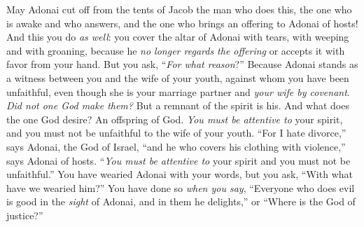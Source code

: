 \begin{biblechapter}
\verse May Adonai cut off from the tents of Jacob the man who does this, the one who is awake and who answers, and the one who brings an offering to Adonai of hosts!
\verse And this you do \textit{as well}: you cover the altar of Adonai with tears, with weeping and with groaning, because he \textit{no longer regards the offering} or accepts it with favor from your hand.
\verse But you ask, “\textit{For what reason}?” Because Adonai stands as a witness between you and the wife of your youth, against whom you have been unfaithful, even though she is your marriage partner and \textit{your wife by covenant}.
\verse \textit{Did not one God make them?} But a remnant of the spirit is his. And what does the one God desire? An offspring of God. \textit{You must be attentive to} your spirit, and you must not be unfaithful to the wife of your youth.
\verse “For I hate divorce,” says Adonai, the God of Israel, “and he who covers his clothing with violence,” says Adonai of hosts. “\textit{You must be attentive to} your spirit and you must not be unfaithful.”
\verse You have wearied Adonai with your words, but you ask, “With what have we wearied him?” You have done so \textit{when you say}, “Everyone who does evil is good in the \textit{sight} of Adonai, and in them he delights,” or “Where is the God of justice?”
\end{biblechapter}

